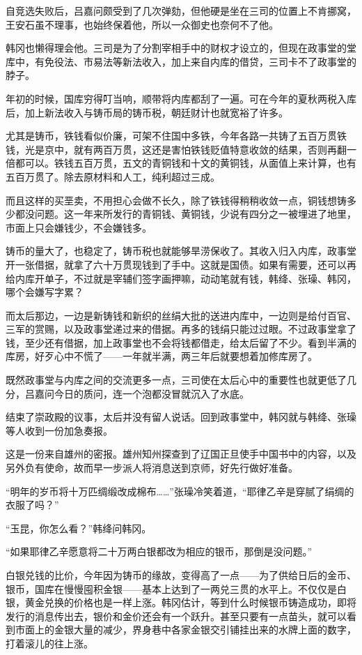 自竞选失败后，吕嘉问颇受到了几次弹劾，但他硬是坐在三司的位置上不肯挪窝，王安石虽不理事，也始终保着他，所以一众御史也奈何不了他。

韩冈也懒得理会他。三司是为了分割宰相手中的财权才设立的，但现在政事堂的堂库中，有免役法、市易法等新法收入，加上来自内库的借贷，三司卡不了政事堂的脖子。

年初的时候，国库穷得叮当响，顺带将内库都刮了一遍。可在今年的夏秋两税入库后，加上新法收入与铸币局的铸币税，朝廷财计也就宽裕了许多。

尤其是铸币，铁钱看似价廉，可架不住国中多铁，今年各路一共铸了五百万贯铁钱，光是京中，就有两百万贯，这还是害怕铁钱贬值特意收敛的结果，否则再翻一倍都可以。铁钱五百万贯，五文的青铜钱和十文的黄铜钱，从面值上来计算，也有五百万贯了。除去原材料和人工，纯利超过三成。

而且这样的买垩卖，不用担心会做不长久，除了铁钱得稍稍收敛一点，铜钱想铸多少都没问题。这一年来所发行的青铜钱、黄铜钱，少说有四分之一被埋进了地里，市面上只会嫌钱少，不会嫌钱多。

铸币的量大了，也稳定了，铸币税也就能够旱涝保收了。其收入归入内库，政事堂开一张借据，就拿了六十万贯现钱到了手中。这就是国债。如果有需要，还可以再给内库开单子，不过就是宰辅们签字画押嘛，动动笔就有钱，韩绛、张璪、韩冈，哪个会嫌写字累？

而太后那边，一边是新铸钱和新织的丝绢大批的送进内库中，一边则是给付百官、三军的赏赐，以及政事堂递过来的借据。再多的钱绢只能过过眼。不过政事堂拿了钱，至少还有借据，加上政事堂也不会将钱都借走，给太后留了不少。看到半满的库房，好歹心中不慌了——一年就半满，两三年后就要想着加修库房了。

既然政事堂与内库之间的交流更多一点，三司使在太后心中的重要性也就更低了几分，吕嘉问今日的质问，连一个泡都没冒就沉入了水底。

结束了崇政殿的议事，太后并没有留人说话。回到政事堂中，韩冈就与韩绛、张璪等人收到一份加急奏报。

这是一份来自雄州的密报。雄州知州探查到了辽国正旦使手中国书中的内容，以及另外负有使命，故而早一步派人将消息送到京师，好先行做好准备。

“明年的岁币将十万匹绸缎改成棉布……”张璪冷笑着道，“耶律乙辛是穿腻了绢绸的衣服了吗？”

“玉昆，你怎么看？”韩绛问韩冈。

“如果耶律乙辛愿意将二十万两白银都改为相应的银币，那倒是没问题。”

白银兑钱的比价，今年因为铸币的缘故，变得高了一点——为了供给日后的金币、银币，国库在慢慢囤积金银——基本上达到了一两兑三贯的水平上。不仅仅是白银，黄金兑换的价格也是一样上涨。韩冈估计，等到什么时候银币铸造成功，即将发行的消息传出去，银价和金价还会有一个跃升。甚至只要有一点苗头，就可以看到市面上的金银大量的减少，界身巷中各家金银交引铺挂出来的水牌上面的数字，打着滚儿的往上涨。

